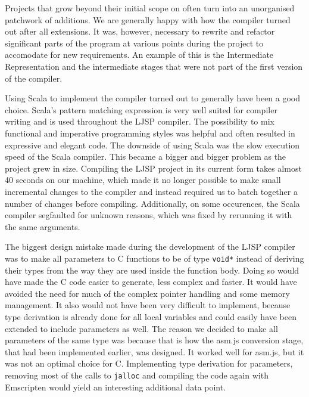 \documentclass[11pt]{report}
\begin{document}
Projects that grow beyond their initial scope on often turn into an unorganised patchwork of additions. We are generally happy with how the compiler turned out after all extensions. It was, however, necessary to rewrite and refactor significant parts of the program at various points during the project to accomodate for new requirements. An example of this is the Intermediate Representation and the intermediate stages that were not part of the first version of the compiler.

Using Scala to implement the compiler turned out to generally have been a good choice. Scala's pattern matching expression is very well suited for compiler writing and is used throughout the LJSP compiler. The possibility to mix functional and imperative programming styles was helpful and often resulted in expressive and elegant code. The downside of using Scala was the slow execution speed of the Scala compiler. This became a bigger and bigger problem as the project grew in size. Compiling the LJSP project in its current form takes almost 40 seconds on our machine, which made it no longer possible to make small incremental changes to the compiler and instead required us to batch together a number of changes before compiling. Additionally, on some occurences, the Scala compiler segfaulted for unknown reasons, which was fixed by rerunning it with the same arguments.

The biggest design mistake made during the development of the LJSP compiler was to make all parameters to C functions to be of type \texttt{void*} instead of deriving their types from the way they are used inside the function body. Doing so would have made the C code easier to generate, less complex and faster. It would have avoided the need for much of the complex pointer handling and some memory management. It also would not have been very difficult to implement, because type derivation is already done for all local variables and could easily have been extended to include parameters as well. The reason we decided to make all parameters of the same type was because that is how the asm.js conversion stage, that had been implemented earlier, was designed. It worked well for asm.js, but it was not an optimal choice for C. Implementing type derivation for parameters, removing most of the calls to \texttt{jalloc} and compiling the code again with Emscripten would yield an interesting additional data point.
\end{document}
